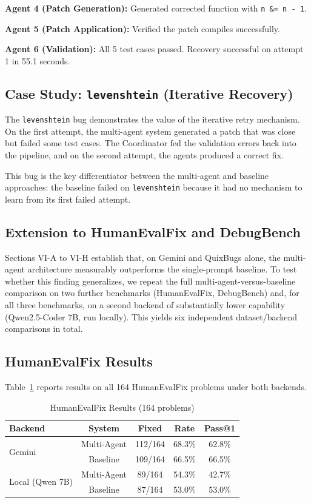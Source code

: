 \documentclass[conference]{IEEEtran}
\begin{document}
\textbf{Agent 4 (Patch Generation):} Generated corrected function with \texttt{n \&= n - 1}.

\textbf{Agent 5 (Patch Application):} Verified the patch compiles successfully.

\textbf{Agent 6 (Validation):} All 5 test cases passed. Recovery successful on attempt 1 in 55.1 seconds.

\subsection{Case Study: \texttt{levenshtein} (Iterative Recovery)}
The \texttt{levenshtein} bug demonstrates the value of the iterative retry mechanism. On the first attempt, the multi-agent system generated a patch that was close but failed some test cases. The Coordinator fed the validation errors back into the pipeline, and on the second attempt, the agents produced a correct fix.

This bug is the key differentiator between the multi-agent and baseline approaches: the baseline failed on \texttt{levenshtein} because it had no mechanism to learn from its first failed attempt.

\subsection{Extension to HumanEvalFix and DebugBench}
Sections VI-A to VI-H establish that, on Gemini and QuixBugs alone, the multi-agent architecture measurably outperforms the single-prompt baseline. To test whether this finding generalizes, we repeat the full multi-agent-versus-baseline comparison on two further benchmarks (HumanEvalFix, DebugBench) and, for all three benchmarks, on a second backend of substantially lower capability (Qwen2.5-Coder 7B, run locally). This yields six independent dataset/backend comparisons in total.

\subsection{HumanEvalFix Results}
Table~\ref{tab:humanevalfix} reports results on all 164 HumanEvalFix problems under both backends.

\begin{table}[htbp]
\caption{HumanEvalFix Results (164 problems)}
\label{tab:humanevalfix}
\centering
\small
\begin{tabular}{lcccc}
\toprule
\textbf{Backend} & \textbf{System} & \textbf{Fixed} & \textbf{Rate} & \textbf{Pass@1} \\
\midrule
\multirow{2}{*}{Gemini} & Multi-Agent & 112/164 & 68.3\% & 62.8\% \\
 & Baseline & 109/164 & 66.5\% & 66.5\% \\
\multirow{2}{*}{Local (Qwen 7B)} & Multi-Agent & 89/164 & 54.3\% & 42.7\% \\
 & Baseline & 87/164 & 53.0\% & 53.0\% \\
\bottomrule
\end{tabular}
\end{table}
\end{document}
